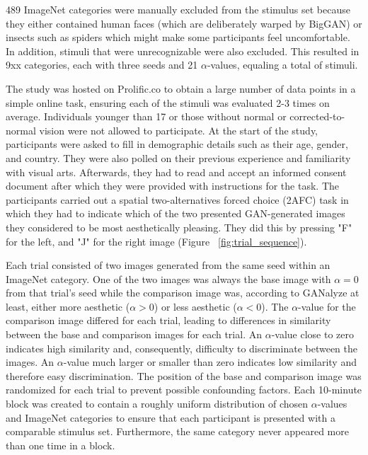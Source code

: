 \documentclass[../main.tex]{subfiles}
\begin{document}
489 ImageNet categories were manually excluded from the stimulus set because they either contained human faces (which are deliberately warped by BigGAN) or insects such as spiders which might make some participants feel uncomfortable. In addition, stimuli that were unrecognizable were also excluded. This resulted in 9xx categories, each with three seeds and 21 $\alpha$-values, equaling a total of \totalstimuli{} stimuli.

The study was hosted on Prolific.co to obtain a large number of data points in a simple online task, ensuring each of the \totalstimuli{} stimuli was evaluated 2-3 times on average. Individuals younger than 17 or those without normal or corrected-to-normal vision were not allowed to participate. At the start of the study, participants were asked to fill in demographic details such as their age, gender, and country. They were also polled on their previous experience and familiarity with visual arts. Afterwards, they had to read and accept an informed consent document after which they were provided with instructions for the task.
The participants carried out a spatial two-alternatives forced choice (2AFC) task in which they had to indicate which of the two presented GAN-generated images they considered to be most aesthetically pleasing. They did this by pressing "F" for the left, and "J" for the right image (Figure ~\ref{fig:trial_sequence}).

Each trial consisted of two images generated from the same seed within an ImageNet category. One of the two images was always the base image with $\alpha = 0$ from that trial’s seed while the comparison image was, according to GANalyze at least, either more aesthetic ($\alpha > 0$) or less aesthetic ($\alpha < 0$). The $\alpha$-value for the comparison image differed for each trial, leading to differences in similarity between the base and comparison images for each trial. An $\alpha$-value close to zero indicates high similarity and, consequently, difficulty to discriminate between the images. An $\alpha$-value much larger or smaller than zero indicates low similarity and therefore easy discrimination. The position of the base and comparison image was randomized for each trial to prevent possible confounding factors. Each 10-minute block was created to contain a roughly uniform distribution of chosen $\alpha$-values and ImageNet categories to ensure that each participant is presented with a comparable stimulus set. Furthermore, the same category never appeared more than one time in a block.
\end{document}

